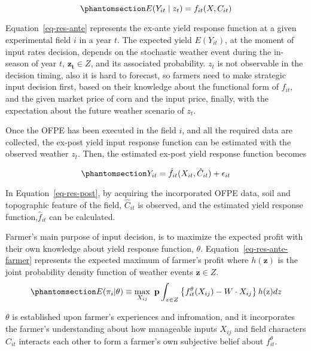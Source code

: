 \documentclass[
]{article}
\begin{document}
\begin{equation}\phantomsection\label{eq-res-ante}{
E(Y_{it} \mid z_t) =  f_{it}(X,C_{it})
}\end{equation}

Equation~\ref{eq-res-ante} represents the ex-ante yield response
function at a given experimental field \(i\) in a year \(t\). The
expected yield \(E(Y_{it})\), at the moment of input rates decision,
depends on the stochastic weather event during the in-season of year
\(t\), \(\mathbf{z_t} \in Z\), and its associated probability. \(z_t\)
is not observable in the decision timing, also it is hard to forecast,
so farmers need to make strategic input decision first, based on their
knowledge about the functional form of \(f_{it}\), and the given market
price of corn and the input price, finally, with the expectation about
the future weather scenario of \(z_t\).

Once the OFPE has been executed in the field \(i\), and all the required
data are collected, the ex-post yield input response function can be
estimated with the observed weather \(z_t\). Then, the estimated ex-post
yield response function becomes

\begin{equation}\phantomsection\label{eq-res-post}{
Y_{it} = \hat{f}_{it}(X_{it}, \hat{C}_{it}) + \epsilon_{it}
}\end{equation}

In Equation~\ref{eq-res-post}, by acquiring the incorporated OFPE data,
soil and topographic feature of the field, \(\hat{C}_{it}\) is observed,
and the estimated yield response function,\(\hat{f}_{it}\) can be
calculated.

Farmer's main purpose of input decision, is to maximize the expected
profit with their own knowledge about yield response function,
\(\theta\). Equation~\ref{eq-res-ante-farmer} represents the expected
maximum of farmer's profit where \(\mathit{h}(\mathbf{z})\) is the joint
probability density function of weather events \(\mathbf{z} \in Z\).
\begin{equation}\phantomsection\label{eq-res-ante-farmer}{
E(\pi_i|\theta) \equiv \max_{X_{ij}} \ \mathbf{p} \int_{z \in Z} \left\{f_{it}^\theta(X_{ij}) - W \cdot X_{ij} \right\} h(\mathrm{z})dz
}\end{equation}

\(\theta\) is established upon farmer's experiences and infromation, and
it incorporates the farmer's understanding about how manageable inputs
\(X_{ij}\) and field characters \(C_{it}\) interacts each other to form
a farmer's own subjective belief about \(f_{it}^\theta\).
\end{document}
